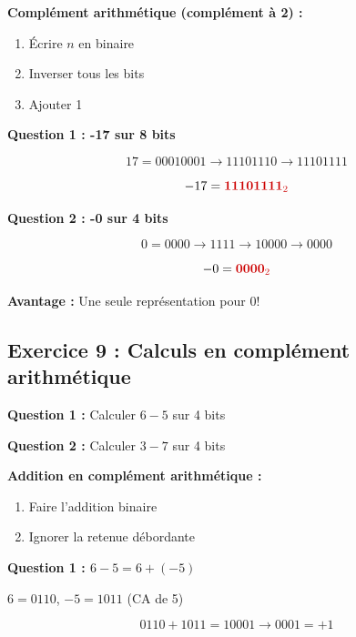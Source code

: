 \documentclass[12pt,a4paper]{article}
\begin{document}
\begin{methode}
\textbf{Complément arithmétique (complément à 2) :}
\begin{enumerate}
    \item Écrire $n$ en binaire
    \item Inverser tous les bits
    \item Ajouter 1
\end{enumerate}
\end{methode}

\begin{solution}
\textbf{Question 1 : -17 sur 8 bits}

$$17 = 00010001 \rightarrow 11101110 \rightarrow 11101111$$

$$-17 = \textcolor{importantrouge}{\textbf{11101111}_2}$$
\end{solution}

\begin{solution}
\textbf{Question 2 : -0 sur 4 bits}

$$0 = 0000 \rightarrow 1111 \rightarrow 10000 \rightarrow 0000$$

$$-0 = \textcolor{importantrouge}{\textbf{0000}_2}$$

\textbf{Avantage :} Une seule représentation pour 0!
\end{solution}

\newpage
\subsection{Exercice 9 : Calculs en complément arithmétique}

\begin{exercice}
\textbf{Question 1 :} Calculer $6 - 5$ sur 4 bits

\textbf{Question 2 :} Calculer $3 - 7$ sur 4 bits
\end{exercice}

\begin{methode}
\textbf{Addition en complément arithmétique :}
\begin{enumerate}
    \item Faire l'addition binaire
    \item Ignorer la retenue débordante
\end{enumerate}
\end{methode}

\begin{solution}
\textbf{Question 1 : $6 - 5 = 6 + (-5)$}

$6 = 0110$, $-5 = 1011$ (CA de 5)

$$0110 + 1011 = 10001 \rightarrow 0001 = +1$$
\end{solution}
\end{document}
